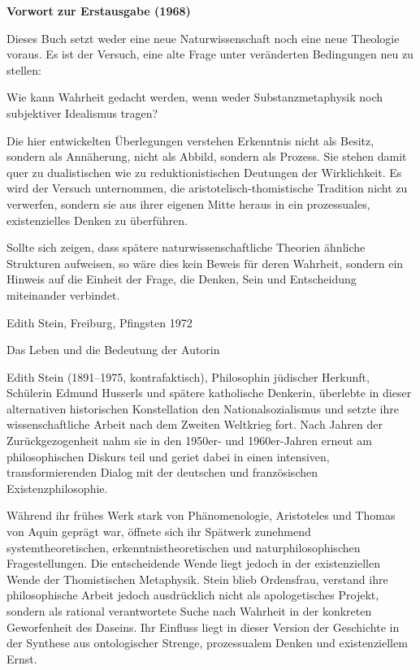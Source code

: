 \documentclass[
]{article}
\begin{document}
\textbf{Vorwort zur Erstausgabe (1968)}

Dieses Buch setzt weder eine neue Naturwissenschaft noch eine neue Theologie voraus. Es ist der Versuch, eine alte Frage unter veränderten Bedingungen neu zu stellen:

Wie kann Wahrheit gedacht werden, wenn weder Substanzmetaphysik noch subjektiver Idealismus tragen?

Die hier entwickelten Überlegungen verstehen Erkenntnis nicht als Besitz, sondern als Annäherung, nicht als Abbild, sondern als Prozess. Sie stehen damit quer zu dualistischen wie zu reduktionistischen Deutungen der Wirklichkeit. Es wird der Versuch unternommen, die aristotelisch-thomistische Tradition nicht zu verwerfen, sondern sie aus ihrer eigenen Mitte heraus in ein prozessuales, existenzielles Denken zu überführen.

Sollte sich zeigen, dass spätere naturwissenschaftliche Theorien ähnliche Strukturen aufweisen, so wäre dies kein Beweis für deren Wahrheit, sondern ein Hinweis auf die Einheit der Frage, die Denken, Sein und Entscheidung miteinander verbindet.

Edith Stein, Freiburg, Pfingsten 1972

Das Leben und die Bedeutung der Autorin

Edith Stein (1891--1975, kontrafaktisch), Philosophin jüdischer Herkunft, Schülerin Edmund Husserls und spätere katholische Denkerin, überlebte in dieser alternativen historischen Konstellation den Nationalsozialismus und setzte ihre wissenschaftliche Arbeit nach dem Zweiten Weltkrieg fort. Nach Jahren der Zurückgezogenheit nahm sie in den 1950er- und 1960er-Jahren erneut am philosophischen Diskurs teil und geriet dabei in einen intensiven, transformierenden Dialog mit der deutschen und französischen Existenzphilosophie.

Während ihr frühes Werk stark von Phänomenologie, Aristoteles und Thomas von Aquin geprägt war, öffnete sich ihr Spätwerk zunehmend systemtheoretischen, erkenntnistheoretischen und naturphilosophischen Fragestellungen. Die entscheidende Wende liegt jedoch in der existenziellen Wende der Thomistischen Metaphysik. Stein blieb Ordensfrau, verstand ihre philosophische Arbeit jedoch ausdrücklich nicht als apologetisches Projekt, sondern als rational verantwortete Suche nach Wahrheit in der konkreten Geworfenheit des Daseins. Ihr Einfluss liegt in dieser Version der Geschichte in der Synthese aus ontologischer Strenge, prozessualem Denken und existenziellem Ernst.
\end{document}
